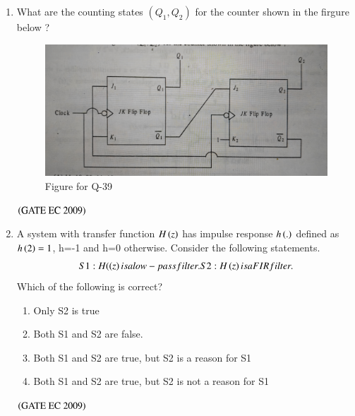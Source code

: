 \documentclass[journal,12pt,onecolumn]{IEEEtran}
\theoremstyle{remark}
\begin{document}
\begin{enumerate}[start=1, label={Q\arabic*.}]
\item What are the counting states $(Q_1, Q_2)$ for the counter shown in the firgure below ?
\begin{figure}[H]
    \centering
    \includegraphics[width=0.5\columnwidth]{figs/img_17.jpg}
    \caption{Figure for Q-39}
    \label{fig:placeholder_17}
\end{figure}
\begin{enumerate}
\end{enumerate}
\hfill $\left(\text{GATE EC 2009}\right)$

\item A system with transfer function $H\left(z\right)$ has impulse response $h\left(.\right)$ defined as $h\left(2\right)=1$, h=-1 and h=0 otherwise. Consider the following statements.
\begin{align*}
    S1: H(\brak{z} is a low-pass filter.
    
    S2: H\brak{z} is a FIR filter.
\end{align*}
Which of the following is correct?
\begin{enumerate}
        \item Only S2 is true
        \item Both S1 and S2 are false.
        \item Both S1 and S2 are true, but S2 is a reason for S1
        \item Both S1 and S2 are true, but S2 is not a reason for S1
\end{enumerate}
\hfill $\left(\text{GATE EC 2009}\right)$


\end{enumerate}
\end{document}
